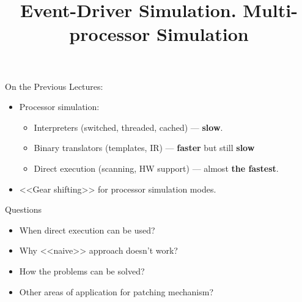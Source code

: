
\title{Event-Driver Simulation. Multi-processor Simulation}

%
%



\startslides

\begin{frame}{On the Previous Lectures:}
\begin{itemize}
\item Processor simulation:
  \begin{itemize}
  \item Interpreters (switched, threaded, cached) --- \textbf{slow}.
  \item Binary translators (templates, IR) --- \textbf{faster} but still
    \textbf{slow}
  \item Direct execution (scanning, HW support) --- almost
    \textbf{the fastest}.
  \end{itemize}
\item{<<Gear shifting>> for processor simulation modes.}
\end{itemize}
\end{frame}

\begin{frame}{Questions}
\begin{itemize}
\item When direct execution can be used?\pause
\item Why <<naive>> approach doesn't work?\pause
\item How the problems can be solved?\pause
\item Other areas of application for patching mechanism?
\end{itemize}
\end{frame}

